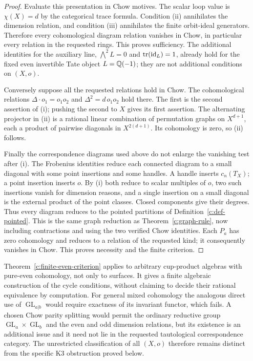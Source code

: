 \begin{proof}
Evaluate this presentation in Chow motives.  The scalar loop value
is $\chi(X)=d$ by the categorical trace formula.  Condition (ii)
annihilates the dimension relation, and condition (iii) annihilates
the finite orbit-ideal generators.  Therefore every cohomological
diagram relation vanishes in Chow, in particular every relation in
the requested rings.  This proves sufficiency.
The additional identities for the auxiliary line,
$\bigwedge^2 L=0$ and $\operatorname{tr}(\operatorname{id}_L)=1$, already hold
for the fixed even invertible Tate object $L=\mathbb Q(-1)$; they are
not additional conditions on $(X,o)$.

Conversely suppose all the requested relations hold in Chow.
The cohomological relations
$\Delta\cdot o_1=o_1o_2$ and
$\Delta^2=d\,o_1o_2$ hold there.  The first is the second assertion
of (i); pushing the second to $X$ gives its first assertion.
The alternating projector in (ii) is a rational linear combination
of permutation graphs on $X^{d+1}$, each a product of pairwise
diagonals in $X^{2(d+1)}$.  Its cohomology is zero, so (ii) follows.

Finally the correspondence diagrams used above do not enlarge the
vanishing test after (i).  The Frobenius identities reduce each
connected diagram to a small diagonal with some point insertions
and some handles.  A handle inserts $c_n(T_X)$; a point insertion
inserts $o$.  By (i) both reduce to scalar multiples of $o$, two
such insertions vanish for dimension reasons, and a single insertion
on a small diagonal is the external product of the point classes.
Closed components give their degrees.  Thus every diagram reduces
to the pointed partitions of Definition~\ref{c:def-pointed}.
This is the same graph reduction as Theorem~\ref{c:graph-rule},
now including contractions and using the two verified Chow
identities.  Each $P_a$ has zero cohomology and reduces to a relation
of the requested kind; it consequently vanishes in Chow.  This
proves necessity and the finite criterion.
\end{proof}

\begin{remark}
\label{c:finite-criterion-scope}
Theorem~\ref{c:finite-even-criterion} applies to arbitrary cup-product
algebras with pure-even cohomology, not only to surfaces.  It gives
a finite algebraic construction of the cycle conditions, without
claiming to decide their rational equivalence by computation.
For general mixed cohomology the analogous direct use of
$\operatorname{GL}_{a|b}$ would require exactness of its invariant
functor, which fails.  A chosen Chow parity splitting would permit
the ordinary reductive group $\operatorname{GL}_a\times
\operatorname{GL}_b$ and the even and odd dimension relations, but
its existence is an additional issue and it need not lie in the
requested tautological correspondence category.  The unrestricted
classification of all $(X,o)$ therefore remains distinct from the
specific K3 obstruction proved below.
\end{remark}


